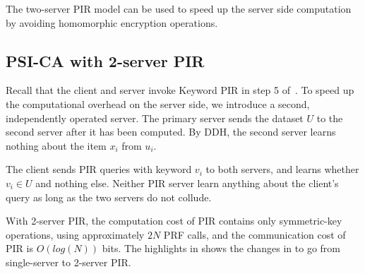 The two-server PIR model can be used to speed up the server side computation by avoiding homomorphic encryption operations.

\subsection{PSI-CA with 2-server PIR}
Recall that the client and server invoke Keyword PIR in step 5 of~. To speed up the computational overhead on the server side, we introduce a second, independently operated server. The primary server sends the dataset $U$ to the second server after it has been computed. By DDH, the second server learns nothing about the item $x_i$ from $u_i$.

The client sends PIR queries with keyword $v_i$ to both servers, and learns whether $v_i \in U$ and nothing else. Neither PIR server learn anything about the client's query as long as the two servers do not collude. 

With 2-server PIR, the computation cost of PIR contains only symmetric-key operations, using approximately $2N$ PRF calls, and the communication cost of PIR is $O(log(N))$ bits. The highlights in  shows the changes in \psica to go from single-server to 2-server PIR.


